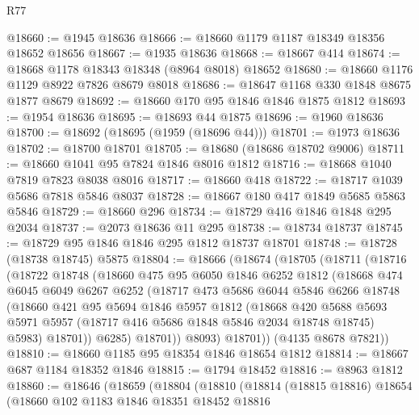 \begin{lexlean}{R77}
\begin{coremodule}
@18660 := @1945 @18636
@18666 := @18660 @1179 @1187 @18349 @18356 @18652 @18656
@18667 := @1935 @18636
@18668 := @18667 @414
@18674 := @18668 @1178 @18343 @18348 (@8964 @8018) @18652
@18680 := @18660 @1176 @1129 @8922 @7826 @8679 @8018
@18686 := @18647 @1168 @330 @1848 @8675 @1877 @8679
@18692 := @18660 @170 @95 @1846 @1846 @1875 @1812
@18693 := @1954 @18636
@18695 := @18693 @44 @1875
@18696 := @1960 @18636
@18700 := @18692 (@18695 (@1959 (@18696 @44)))
@18701 := @1973 @18636
@18702 := @18700 @18701
@18705 := @18680 (@18686 @18702 @9006)
@18711 := @18660 @1041 @95 @7824 @1846 @8016 @1812
@18716 := @18668 @1040 @7819 @7823 @8038 @8016
@18717 := @18660 @418
@18722 := @18717 @1039 @5686 @7818 @5846 @8037
@18728 := @18667 @180 @417 @1849 @5685 @5863 @5846
@18729 := @18660 @296
@18734 := @18729 @416 @1846 @1848 @295 @2034
@18737 := @2073 @18636 @11 @295
@18738 := @18734 @18737
@18745 := @18729 @95 @1846 @1846 @295 @1812 @18737 @18701
@18748 := @18728 (@18738 @18745) @5875
@18804 := @18666
    (@18674
      (@18705
        (@18711
          (@18716
            (@18722
              @18748
              (@18660
                @475
                @95
                @6050
                @1846
                @6252
                @1812
                (@18668
                  @474
                  @6045
                  @6049
                  @6267
                  @6252
                  (@18717
                    @473
                    @5686
                    @6044
                    @5846
                    @6266
                    @18748
                    (@18660
                      @421
                      @95
                      @5694
                      @1846
                      @5957
                      @1812
                      (@18668
                        @420
                        @5688
                        @5693
                        @5971
                        @5957
                        (@18717 @416 @5686 @1848 @5846 @2034 @18748 @18745)
                        @5983)
                      @18701))
                  @6285)
                @18701))
            @8093)
          @18701))
      (@4135 @8678 @7821))
@18810 := @18660 @1185 @95 @18354 @1846 @18654 @1812
@18814 := @18667 @687 @1184 @18352 @1846
@18815 := @1794 @18452
@18816 := @8963 @1812
@18860 := @18646
    (@18659
      (@18804
        (@18810
          (@18814
            (@18815 @18816)
            @18654
            (@18660
              @102
              @1183
              @1846
              @18351
              @18452
              @18816

\end{coremodule}
\end{lexlean}
